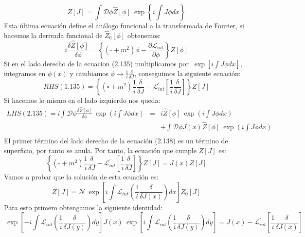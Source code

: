 \begin{equation}
Z[J]=\int\mathcal{D}\phi\hat{Z}[\phi]\ \exp\left\{ i\int J\phi dx\right\}
\end{equation}
Esta última ecuación define el análogo funcional a la transformada de Fourier, si hacemos la derivada funcional de $\hat{Z}_0[\phi]$ obtenemos:
\begin{equation}
i\frac{\delta\hat{Z}[\phi]}{\delta\phi}=\left\{ (\square+m^{2})\phi-\frac{\partial\mathcal{L}_{int}}{\partial\phi}\right\} \hat{Z}[\phi]
\end{equation}
Si en el lado derecho de la ecuacion (2.135) multiplicamos por $\ \exp[i\int J\phi dx]$, integramos en $\phi(x)$ y cambiamos $\phi \rightarrow \frac{1}{i}\frac{\delta}{\delta J}$, conseguimos la siguiente ecuación:
\begin{equation}
RHS(1.135)=\left\{ (\square +m^{2})\frac{1}{i}\frac{\delta}{\delta J}-\mathcal{L}_{int}^{\prime}\left[\frac{1}{i}\frac{\delta}{\delta J}\right]\right\} Z[J]
\end{equation} 
Si hacemos lo mismo en el lado izquierdo nos queda:
\begin{eqnarray}
\nonumber LHS(2.135)=i\int\mathcal{D}\phi\frac{\delta\hat{Z}[\phi]}{\delta\phi}\ \exp\left(i\int J\phi dx\right)&=& i\hat{Z}[\phi]\ \exp\left(i\int J\phi dx\right)\\
\nonumber &&+\int\mathcal{D}\phi J(x)\hat{Z}[\phi]\ \exp\left(i\int J\phi dx\right)\\
\end{eqnarray}
El primer término del lado derecho de la ecuación (2.138) es un término de superficio, por tanto se anula. Por tanto, la ecuación que cumple $Z[J]$ es:
\begin{equation}
\left\{ (\square+m^{2})\frac{1}{i}\frac{\delta}{\delta J}-\mathcal{L}_{int}^{\prime}\left[\frac{1}{i}\frac{\delta}{\delta J}\right]\right\} Z[J]=J(x)Z[J]
\end{equation}
Vamos a probar que la solución de esta ecuación es:
\begin{equation}
Z[J]=\mathcal{N}\ \exp\left[i\int\mathcal{L}_{int}\left(\frac{1}{i}\frac{\delta}{\delta J(x)}\right)dx\right]Z_{0}[J]
\end{equation} 
Para esto primero obtengamos la siguiente identidad:
\begin{equation}
\ \exp\left[-i\int\mathcal{L}_{int}\left(\frac{1}{i}\frac{\delta}{\delta J(y)}\right)dy\right]J(x)\ \exp\left[i\int\mathcal{L}_{int}\left(\frac{1}{i}\frac{\delta}{\delta J(y)}\right)dy\right]=J(x)-\mathcal{L}_{int}^{\prime}\left[\frac{1}{i}\frac{\delta}{\delta J(x)}\right]
\end{equation}
